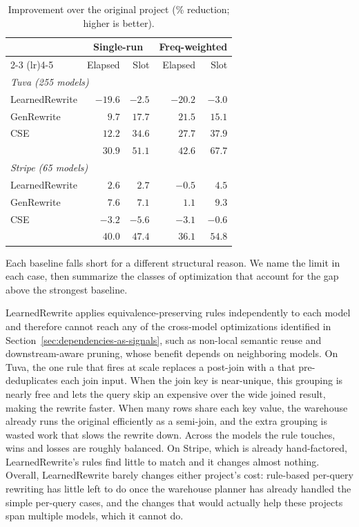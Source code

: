 \begin{table}[tb]
\centering
\caption{Improvement over the original project (\% reduction; higher is better). }
\inv
\label{tab:overall}
\small
\begin{tabular}{lrrrr}
\toprule
& \multicolumn{2}{c}{Single-run} & \multicolumn{2}{c}{Freq-weighted} \\
\cmidrule(lr){2-3} \cmidrule(lr){4-5}
& Elapsed & Slot & Elapsed & Slot \\
\midrule
\multicolumn{5}{l}{\emph{Tuva (255 models)}} \\
LearnedRewrite & $-19.6$ & $-2.5$ & $-20.2$ & $-3.0$ \\
GenRewrite     & $9.7$   & $17.7$ & $21.5$  & $15.1$ \\
CSE            & $12.2$  & $34.6$ & $27.7$  & $37.9$ \\
\tool{}        & $\mathbf{30.9}$ & $\mathbf{51.1}$ & $\mathbf{42.6}$ & $\mathbf{67.7}$ \\
\midrule
\multicolumn{5}{l}{\emph{Stripe (65 models)}} \\
LearnedRewrite & $2.6$   & $2.7$   & $-0.5$  & $4.5$  \\
GenRewrite     & $7.6$   & $7.1$   & $1.1$   & $9.3$  \\
CSE            & $-3.2$  & $-5.6$  & $-3.1$  & $-0.6$ \\
\tool{}        & $\mathbf{40.0}$ & $\mathbf{47.4}$ & $\mathbf{36.1}$ & $\mathbf{54.8}$ \\
\bottomrule
\end{tabular}
\inv
\end{table}

Each baseline falls short for a different structural reason. We name the limit in each case, then summarize the classes of optimization that account for the gap above the strongest baseline.

 LearnedRewrite applies equivalence-preserving rules independently to each model and therefore cannot reach any of the cross-model optimizations identified in Section~\ref{sec:dependencies-as-signals}, such as non-local semantic reuse and downstream-aware pruning, whose benefit depends on neighboring models. On Tuva, the one rule that fires at scale replaces a post-join  with a  that pre-deduplicates each join input. When the join key is near-unique, this grouping is nearly free and lets the query skip an expensive  over the wide joined result, making the rewrite faster. When many rows share each key value, the warehouse already runs the original efficiently as a semi-join, and the extra grouping is wasted work that slows the rewrite down. Across the models the rule touches, wins and losses are roughly balanced. On Stripe, which is already hand-factored, LearnedRewrite's rules find little to match and it changes almost nothing. Overall, LearnedRewrite barely changes either project's cost: rule-based per-query rewriting has little left to do once the warehouse planner has already handled the simple per-query cases, and the changes that would actually help these projects span multiple models, which it cannot do.


